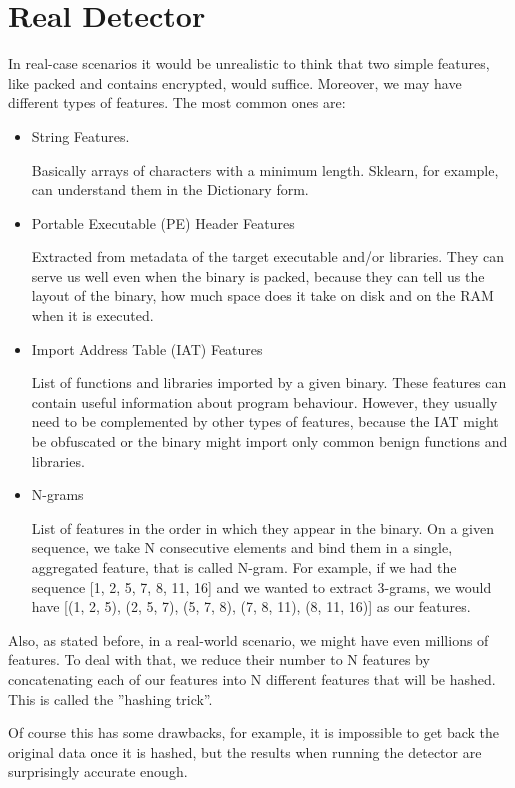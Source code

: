 \documentclass[]{project_plan}
\begin{document}
\section{Real Detector}
In real-case scenarios it would be unrealistic to think that two simple features,
like packed and contains encrypted, would suffice. Moreover, we may have
different types of features. The most common ones are:
\begin{itemize}
  \item  String Features.

        Basically arrays of characters with a minimum length.
        Sklearn, for example, can understand them in the Dictionary form.
  \item Portable Executable (PE) Header Features

        Extracted from metadata of the target executable and/or libraries. They can serve us well
        even when the binary is packed, because they can tell us the layout of the
        binary, how much space does it take on disk and on the RAM when it is
        executed.
  \item Import Address Table (IAT) Features

        List of functions and libraries
        imported by a given binary. These features can contain useful information
        about program behaviour. However, they usually need to be complemented by
        other types of features, because the IAT might be obfuscated
        or the binary might import only common benign functions and libraries.
  \item N-grams

        List of features in the order in which they appear in the binary.
        On a given sequence, we take N consecutive elements and bind them in a
        single, aggregated feature, that is called N-gram. For example, if we had
        the sequence [1, 2, 5, 7, 8, 11, 16] and we wanted to extract 3-grams, we
        would have [(1, 2, 5), (2, 5, 7), (5, 7, 8), (7, 8, 11), (8, 11, 16)] as our
        features.
\end{itemize}

Also, as stated before, in a real-world scenario, we might have even millions
of features. To deal with that, we reduce their number to N features by
concatenating each of our features into N different features that will be
hashed. This is called the ”hashing trick”.

Of course this has some drawbacks, for example,
it is impossible to get back the original data once it is hashed, but the results
when running the detector are surprisingly accurate enough.
\end{document}
